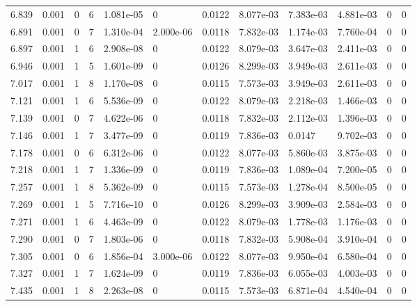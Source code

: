 \documentclass[preview]{standalone}
\begin{document}
{{{{{\begin{tabular}{L{1.2cm}C{1.2cm} C{0.3cm}C{0.5cm} C{1.4cm}C{1.4cm} C{1.4cm}C{1.4cm} C{1.6cm}C{1.6cm} C{1.6cm}C{1.6cm}}
  6.839  &  0.001  & 0     &  6 &  1.081e-05  & 0  &  0.0122&   8.077e-03& 7.383e-03 & 4.881e-03   &  0 & 0  \\ 
  6.891  &  0.001  & 0     &  7 &  1.310e-04  & 2.000e-06  &  0.0118&   7.832e-03& 1.174e-03 & 7.760e-04   &  0 & 0  \\ 
  6.897  &  0.001  & 1     &  6 &  2.908e-08  & 0  &  0.0122&   8.079e-03& 3.647e-03 & 2.411e-03   &  0 & 0  \\ 
  6.946  &  0.001  & 1     &  5 &  1.601e-09  & 0  &  0.0126&   8.299e-03& 3.949e-03 & 2.611e-03   &  0 & 0  \\ 
  7.017  &  0.001  & 1     &  8 &  1.170e-08  & 0  &  0.0115&   7.573e-03& 3.949e-03 & 2.611e-03   &  0 & 0  \\ 
  7.121  &  0.001  & 1     &  6 &  5.536e-09  & 0  &  0.0122&   8.079e-03& 2.218e-03 & 1.466e-03   &  0 & 0  \\ 
  7.139  &  0.001  & 0     &  7 &  4.622e-06  & 0  &  0.0118&   7.832e-03& 2.112e-03 & 1.396e-03   &  0 & 0  \\ 
  7.146  &  0.001  & 1     &  7 &  3.477e-09  & 0  &  0.0119&   7.836e-03& 0.0147 & 9.702e-03   &  0 & 0  \\ 
  7.178  &  0.001  & 0     &  6 &  6.312e-06  & 0  &  0.0122&   8.077e-03& 5.860e-03 & 3.875e-03   &  0 & 0  \\ 
  7.218  &  0.001  & 1     &  7 &  1.336e-09  & 0  &  0.0119&   7.836e-03& 1.089e-04 & 7.200e-05   &  0 & 0  \\ 
  7.257  &  0.001  & 1     &  8 &  5.362e-09  & 0  &  0.0115&   7.573e-03& 1.278e-04 & 8.500e-05   &  0 & 0  \\ 
  7.269  &  0.001  & 1     &  5 &  7.716e-10  & 0  &  0.0126&   8.299e-03& 3.909e-03 & 2.584e-03   &  0 & 0  \\ 
  7.271  &  0.001  & 1     &  6 &  4.463e-09  & 0  &  0.0122&   8.079e-03& 1.778e-03 & 1.176e-03   &  0 & 0  \\ 
  7.290  &  0.001  & 0     &  7 &  1.803e-06  & 0  &  0.0118&   7.832e-03& 5.908e-04 & 3.910e-04   &  0 & 0  \\ 
  7.305  &  0.001  & 0     &  6 &  1.856e-04  & 3.000e-06  &  0.0122&   8.077e-03& 9.950e-04 & 6.580e-04   &  0 & 0  \\ 
  7.327  &  0.001  & 1     &  7 &  1.624e-09  & 0  &  0.0119&   7.836e-03& 6.055e-03 & 4.003e-03   &  0 & 0  \\ 
  7.435  &  0.001  & 1     &  8 &  2.263e-08  & 0  &  0.0115&   7.573e-03& 6.871e-04 & 4.540e-04   &  0 & 0  \\ 

\end{tabular}}}}}}
\end{document}
